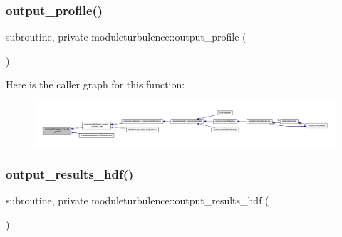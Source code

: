 \subsubsection{\texorpdfstring{output\+\_\+profile()}{output\_profile()}}
{\footnotesize\ttfamily subroutine, private moduleturbulence\+::output\+\_\+profile (\begin{DoxyParamCaption}{ }\end{DoxyParamCaption})\hspace{0.3cm}{\ttfamily [private]}}

Here is the caller graph for this function\+:\nopagebreak
\begin{figure}[H]
\begin{center}
\leavevmode
\includegraphics[width=350pt]{namespacemoduleturbulence_a72996c619e984f58e135b17214de8718_icgraph}
\end{center}
\end{figure}
\mbox{\label{namespacemoduleturbulence_a3366379c368e20e48c460dff1f7585d8}} 
\subsubsection{\texorpdfstring{output\+\_\+results\+\_\+hdf()}{output\_results\_hdf()}}
{\footnotesize\ttfamily subroutine, private moduleturbulence\+::output\+\_\+results\+\_\+hdf (\begin{DoxyParamCaption}{ }\end{DoxyParamCaption})\hspace{0.3cm}{\ttfamily [private]}}

